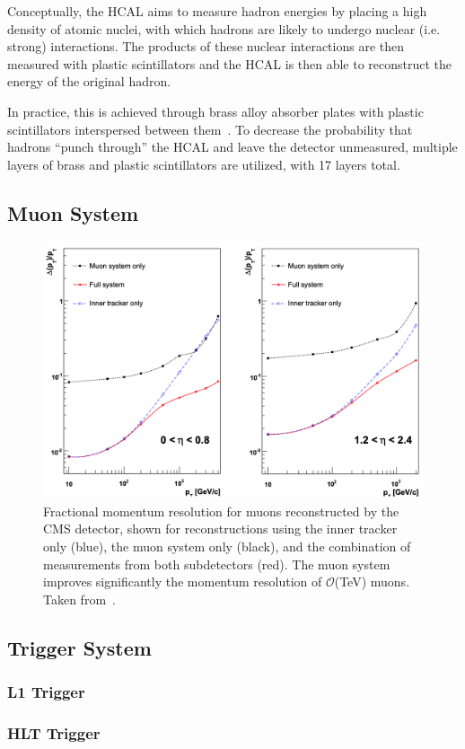 Conceptually, the HCAL aims to measure hadron energies by placing a high density of atomic nuclei, with which hadrons are likely to undergo nuclear (i.e. strong) interactions.
The products of these nuclear interactions are then measured with plastic scintillators and the HCAL is then able to reconstruct the energy of the original hadron.

In practice, this is achieved through brass alloy absorber plates with plastic scintillators interspersed between them~\cite{Bayatian:2006nff}. To decrease the probability that hadrons ``punch through'' the HCAL and leave the detector unmeasured, multiple layers of brass and plastic scintillators are utilized, with 17 layers total.

\subsection{Muon System} \label{sec:cms_muon_system}

\begin{figure} [htbp!]
    \centering
    \includegraphics[width=0.8\linewidth]{figures/cms/cms_tracker_vs_muon.png}
    \caption{Fractional momentum resolution for muons reconstructed by the CMS detector, shown for reconstructions using the inner tracker only (blue), the muon system only (black), and the combination of measurements from both subdetectors (red). The muon system improves significantly the momentum resolution of $\mathcal O$(TeV) muons. Taken from~\cite{Chatrchyan:2008aa}.}
    \label{fig:cms_muon_vs_tracker}
\end{figure}

\subsection{Trigger System} \label{sec:cms_trigger}

\subsubsection{L1 Trigger}

\subsubsection{HLT Trigger}
